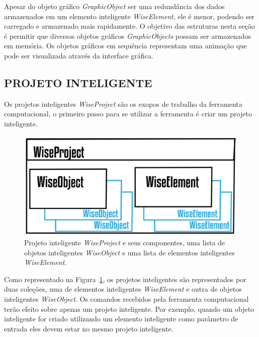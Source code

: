 \documentclass[a4paper,12pt]{monografia}
\theoremstyle{plain}
\theoremstyle{definition}
\theoremstyle{remark}
\begin{document}
Apesar do objeto gráfico \textit{GraphicObject} ser uma redundância dos dados armazenados em um elemento inteligente \textit{WiseElement}, ele é menor, podendo ser carregado e armazenado mais rapidamente. O objetivo das estruturas nesta seção é permitir que diversos objetos gráficos \textit{GraphicObjects} possam ser armazenados em memória. Os objetos gráficos em sequência representam uma animação que pode ser visualizada através da interface gráfica. 


\subsection{PROJETO INTELIGENTE}\label{sec:projeto}

Os projetos inteligentes \textit{WiseProject} são os exopos de trabalho da ferramenta computacional, o primeiro passo para se utilizar a ferramenta é criar um projeto inteligente.


\begin{figure}[!htbp]
	\centering
	\includegraphics[scale=2]{Figures/WiseProject@16x.png}
	\caption{Projeto inteligente \textit{WiseProject} e seus componentes, uma lista de objetos inteligentes \textit{WiseObject} e uma lista de elementos inteligentes \textit{WiseElement}.}
	\label{fig7:project}
\end{figure}

Como representado na Figura~\ref{fig7:project}, os projetos inteligentes são representados por duas coleções, uma de elementos inteligentes \textit{WiseElement} e outra de objetos inteligentes \textit{WiseObject}. Os comandos recebidos pela ferramenta computacional terão efeito sobre apenas um projeto inteligente. Por exemplo, quando um objeto inteligente for criado utilizando um elemento inteligente como parâmetro de entrada eles devem estar no mesmo projeto inteligente.
\end{document}
